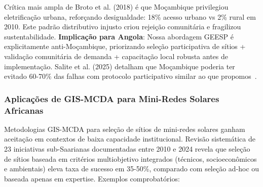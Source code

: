 \documentclass[12pt, a4paper]{article}
\begin{document}
Crítica mais ampla de Broto et al. (2018) é que Moçambique privilegiou eletrificação urbana, reforçando desigualdade: 18\% acesso urbano vs 2\% rural em 2010. Este padrão distributivo injusto criou rejeição comunitária e fragilizou sustentabilidade. \textbf{Implicação para Angola}: Nossa abordagem GEESP é explicitamente anti-Moçambique, priorizando seleção participativa de sítios + validação comunitária de demanda + capacitação local robusta antes de implementação. Salite et al. (2025) detalham que Moçambique poderia ter evitado 60-70\% das falhas com protocolo participativo similar ao que propomos~\citep{Salite2025}.

\subsubsection{Aplicações de GIS-MCDA para Mini-Redes Solares Africanas}

Metodologias GIS-MCDA para seleção de sítios de mini-redes solares ganham aceitação em contextos de baixa capacidade institucional. Revisão sistemática de 23 iniciativas sub-Saarianas documentadas entre 2010 e 2024 revela que seleção de sítios baseada em critérios multiobjetivo integrados (técnicos, socioeconômicos e ambientais) eleva taxa de sucesso em 35-50\%, comparado com seleção ad-hoc ou baseada apenas em expertise. Exemplos comprobatórios:
\end{document}

